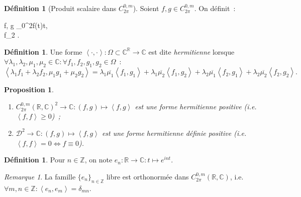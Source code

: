 \documentclass{report}
\newtheorem{prp}[thm]{Proposition}
\theoremstyle{definition}
\newtheorem{déf}[thm]{Définition}
\theoremstyle{remark}
\newtheorem*{rmq}{Remarque}
\numberwithin{equation}{section}
\newcommand{\C}{\mathbb C}
\newcommand{\R}{\mathbb R}
\newcommand{\Z}{\mathbb Z}
\newcommand{\scpr}[2]{\left\langle #1, #2\right\rangle}
\newcommand{\CmT}[2]{C^{#1,m}_{#2}}
\newcommand{\CzmT}[1]{\CmT 0{#1}}
\newcommand{\Czm}{\CzmT{2\pi}}
\begin{document}
			\begin{déf}[Produit scalaire dans $\Czm$] Soient $f, g \in \Czm$. On définit~:
			\begin{subnumcases}{}
				\scpr fg \coloneqq {}\int_0^{2\pi}f(t)\dif t, \\
				\norm f_2 \coloneqq \sqrt {\scpr ff}.
			\end{subnumcases}
			\end{déf}

			\begin{déf} Une forme $\scpr \cdot\cdot : \Omega \subset \C^\R \to \C$ est dite \textit{hermitienne} lorsque
			$\forall \lambda_1, \lambda_2, \mu_1, \mu_2 \in \C : \forall f_1, f_2, g_1, g_2 \in \Omega$~:
			\begin{equation}
					\scpr {\lambda_1 f_1 + \lambda_2 f_2}{\mu_1 g_1 + \mu_2 g_2}
						= \lambda_1\overline {\mu_1}\scpr {f_1}{g_1}
						+ \lambda_1\overline {\mu_2}\scpr {f_1}{g_2}
						+ \lambda_2\overline {\mu_1}\scpr {f_2}{g_1}
						+ \lambda_2\overline {\mu_2}\scpr {f_2}{g_2}.
			\end{equation}
			\end{déf}

			\begin{prp}\label{prp:prop scpr Czm}~
				\begin{enumerate}
					\item $\Czm(\R, \C)^2 \to \C : (f, g) \mapsto \scpr fg$ est une forme hermitienne positive (i.e. $\scpr ff \geq 0$)~;
					\item $\mathcal D^2 \to \C : (f, g) \mapsto \scpr fg$ est une forme hermitienne définie positive (i.e. $\scpr ff = 0 \iff f \equiv 0$).
				\end{enumerate}
			\end{prp}

			\begin{déf} Pour $n \in \Z$, on note $e_n : \R \to \C : t \mapsto e^{int}$.
			\end{déf}

			\begin{rmq} La famille $\{e_n\}_{n \in \Z}$ libre est orthonormée dans $\Czm(\R, \C)$, i.e. $\forall m, n \in \Z : \scpr {e_n}{e_m} = \delta_{mn}$.
			\end{rmq}
\end{document}
